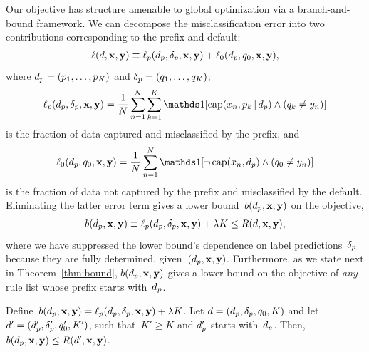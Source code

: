 Our objective has structure amenable to global optimization via a branch-and-bound framework.
%
We can decompose the misclassification error into two contributions
corresponding to the prefix and default:
\begin{align}
\Loss(\RL, \x, \y) %
\equiv \Loss_p(\Prefix, \Labels, \x, \y) + \Loss_0(\Prefix, \Default, \x, \y),
\end{align}
where ${d_p = (p_1, \dots, p_K)}$ and ${\delta_p = (q_1, \dots, q_K)}$;
\begin{align}
\Loss_p(\Prefix, \Labels, \x, \y) =
\frac{1}{N} \sum_{n=1}^N \sum_{k=1}^K \one [ \Cap(x_n, p_k \given \Prefix) \wedge (q_k \neq y_n) ]
\end{align}
is the fraction of data captured and misclassified by the prefix, and
\begin{align}
\Loss_0(\Prefix, \Default, \x, \y) =
\frac{1}{N} \sum_{n=1}^N \one [ \neg\, \Cap(x_n, \Prefix) \wedge (\Default \neq y_n) ]
\end{align}
is the fraction of data not captured by the prefix and misclassified by the default.
%
Eliminating the latter error term gives a lower bound~$b(d_p, \mathbf{x}, \mathbf{y})$ on the objective,
\begin{align}
b(\Prefix, \x, \y) \equiv \Loss_p(\Prefix, \Labels, \x, \y) + \Reg K \le \Obj(\RL, \x, \y),
\label{eq:lower-bound}
\end{align}
where we have suppressed the lower bound's dependence on label predictions~$\delta_p$
because they are fully determined, given~${(d_p, \mathbf{x}, \mathbf{y})}$.
%
Furthermore, as we state next in Theorem~\ref{thm:bound},
$b(d_p, \mathbf{x}, \mathbf{y})$ gives a lower bound on the objective of
\emph{any} rule list whose prefix starts with~$d_p$.

\begin{theorem}
Define~${b(d_p, \mathbf{x}, \mathbf{y}) = \ell_p(d_p, \delta_p, \mathbf{x}, \mathbf{y}) + {\lambda} K}$.
%
Let ${{d} = (d_p, \delta_p, q_0, K)}$
and let ${{d}' = (d_p', \delta_p', q_0', K')}$,
such that~${K' \ge K}$ and $d_p'$ starts with~$d_p$.
%
Then, ${b(d_p, \mathbf{x}, \mathbf{y}) \le R({d}', \mathbf{x}, \mathbf{y})}$.
\label{thm:bound}
\end{theorem}

